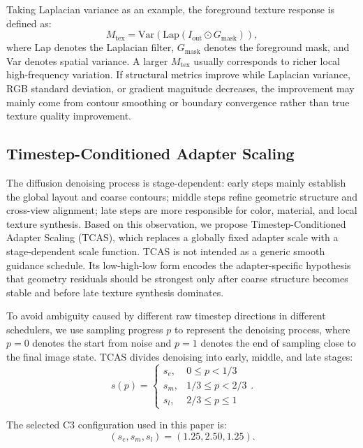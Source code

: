 \documentclass[times,twocolumn,final]{elsarticle}
\begin{document}
Taking Laplacian variance as an example, the foreground texture response is defined as:
\begin{equation}
M_\text{tex} = \text{Var}(\text{Lap}(I_\text{out} \odot G_\text{mask})),
\end{equation}
where Lap denotes the Laplacian filter, $G_\text{mask}$ denotes the foreground mask, and Var denotes spatial variance. A larger $M_\text{tex}$ usually corresponds to richer local high-frequency variation. If structural metrics improve while Laplacian variance, RGB standard deviation, or gradient magnitude decreases, the improvement may mainly come from contour smoothing or boundary convergence rather than true texture quality improvement.

\subsection{Timestep-Conditioned Adapter Scaling}
\label{subsec:tcas}

The diffusion denoising process is stage-dependent: early steps mainly establish the global layout and coarse contours; middle steps refine geometric structure and cross-view alignment; late steps are more responsible for color, material, and local texture synthesis. Based on this observation, we propose Timestep-Conditioned Adapter Scaling (TCAS), which replaces a globally fixed adapter scale with a stage-dependent scale function. TCAS is not intended as a generic smooth guidance schedule. Its low-high-low form encodes the adapter-specific hypothesis that geometry residuals should be strongest only after coarse structure becomes stable and before late texture synthesis dominates.

To avoid ambiguity caused by different raw timestep directions in different schedulers, we use sampling progress $p$ to represent the denoising process, where $p = 0$ denotes the start from noise and $p = 1$ denotes the end of sampling close to the final image state. TCAS divides denoising into early, middle, and late stages:
\begin{equation}
s(p) = \begin{cases} s_e, & 0 \leq p < 1/3 \\ s_m, & 1/3 \leq p < 2/3 \\ s_l, & 2/3 \leq p \leq 1 \end{cases}.
\label{eq:tcas}
\end{equation}

The selected C3 configuration used in this paper is:
\begin{equation}
(s_e, s_m, s_l) = (1.25, 2.50, 1.25).
\end{equation}
\end{document}
